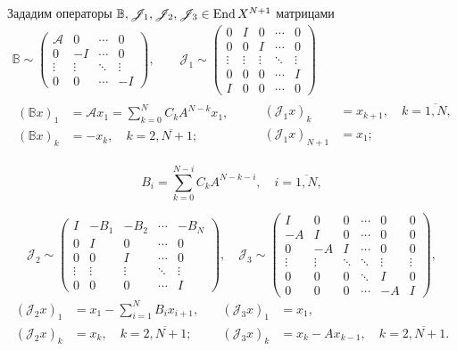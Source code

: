 Зададим операторы $\mathbb B, \mathcal J_1, \mathcal J_2, \mathcal J_3 \in \operatorname{End} X^{N+1}$ матрицами
\begin{gather*}
    \mathbb B \sim \begin{pmatrix}
     \mathcal A & 0 & \cdots &  0 \\
    0 & -I  & \cdots &  0 \\
    \vdots & \vdots & \ddots &  \vdots \\
    0 & 0 & \cdots &  -I
   \end{pmatrix}, \quad\quad \mathcal J_1 \sim \begin{pmatrix}
    0 & I & 0 & \cdots &  0 \\
    0 & 0 & I & \cdots &  0 \\
    \vdots & \vdots & \vdots &  \ddots & \vdots\\
    0 & 0 & 0 & \cdots & I \\
    I & 0 & 0 & \cdots & 0
   \end{pmatrix} \\
    \begin{aligned}
        (\mathbb B x)_1 &= \mathcal A x_1 = \sum_{k = 0}^{N} C_k A^{N - k} x_1, \\
        (\mathbb B x)_k &= -x_k, \quad k = \overline{2,N+1};
    \end{aligned}
    \quad\quad
    \begin{aligned}
        (\mathcal J_1 x)_k &= x_{k + 1}, \quad k = \overline{1,N}, \\
        (\mathcal J_1 x)_{N+1} &= x_1;
    \end{aligned}
\end{gather*}

\[ B_i = \sum_{k=0}^{N-i} C_k A^{N-k-i}, \quad i = \overline{1,N}, \]

\[ \mathcal J_2 \sim \begin{pmatrix}
    I & -B_1 & -B_2 & \cdots & -B_N \\
    0 & I & 0 & \cdots &  0 \\
    0 & 0 & I & \cdots &  0 \\
    \vdots & \vdots & \vdots &  \ddots & \vdots \\
    0 & 0 & 0 & \cdots & I
   \end{pmatrix}, \quad \mathcal J_3 \sim \begin{pmatrix}
    I & 0 & 0 & \cdots & 0 & 0 \\
    -A & I & 0 & \cdots & 0 & 0 \\
    0 & -A & I & \cdots & 0 & 0 \\
    \vdots & \vdots & \ddots & \ddots & \vdots & \vdots \\
    0 & 0 & 0 & \ddots & I & 0 \\
    0 & 0 & 0 & \cdots & -A & I
   \end{pmatrix}, \]
\begin{align*}
    (\mathcal J_2 x)_1 &= x_1 - \sum_{i=1}^{N} B_i x_{i + 1}, \quad &(\mathcal J_3 x)_1 &= x_1, \\
    (\mathcal J_2 x)_k &= x_k, \quad k = \overline{2,N+1}; \quad &(\mathcal J_3 x)_k &= x_k - Ax_{k-1}, \quad k = \overline{2,N+1}.
\end{align*}

